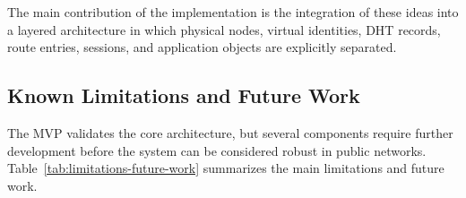 \documentclass[12pt,a4paper]{article}
\begin{document}
The main contribution of the implementation is the integration of these ideas into a layered architecture in which physical nodes, virtual identities, DHT records, route entries, sessions, and application objects are explicitly separated.

\subsection{Known Limitations and Future Work}
\label{sec:implementation-limitations-future-work}

The MVP validates the core architecture, but several components require further development before the system can be considered robust in public networks. Table~\ref{tab:limitations-future-work} summarizes the main limitations and future work.

\begingroup
\small
\renewcommand{\arraystretch}{1.08}
\end{document}
